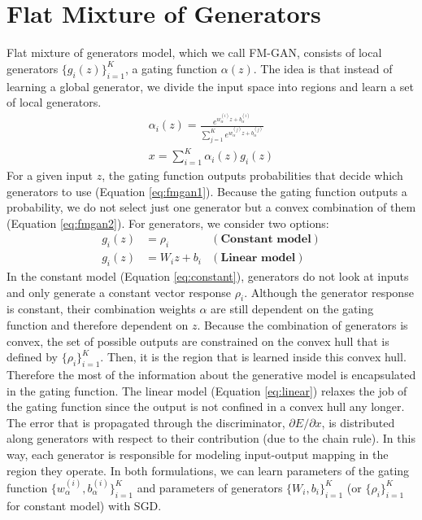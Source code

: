 \documentclass[a4paper,onesided,12pt]{report}
\begin{document}
\section{Flat Mixture of Generators}
\label{sec:fmgan}
Flat mixture of generators model, which we call FM-GAN, consists of local generators $\{g_i(z)\}_{i=1}^{K}$, a gating function $\alpha(z)$. The idea is that instead of learning a global generator, we divide the input space into regions and learn a set of local generators.
\begin{gather}
\alpha_i(z) = \frac{e^{w_{\alpha}^{(i)}z+b_{\alpha}^{(i)}}}{\sum_{j=1}^K e^{w_{\alpha}^{(j)}z+b_{\alpha}^{(j)}}} \label{eq:fmgan1}\\
x = \sum_{i=1}^K \alpha_i(z) g_i(z) \label{eq:fmgan2}
\end{gather}
For a given input $z$, the gating function outputs probabilities that decide which generators to use (Equation \ref{eq:fmgan1}). Because the gating function outputs a probability, we do not select just one generator but a convex combination of them (Equation \ref{eq:fmgan2}). For generators, we consider two options:
\begin{align}
g_i(z) &= \rho_i  & (\textbf{Constant model}) \label{eq:constant}\\
g_i(z) &= W_i z + b_i  & (\textbf{Linear model}) \label{eq:linear}
\end{align}
In the constant model (Equation \ref{eq:constant}), generators do not look at inputs and only generate a constant vector response $\rho_i$. Although the generator response is constant, their combination weights $\alpha$ are still dependent on the gating function and therefore dependent on $z$. Because the combination of generators is convex, the set of possible outputs are constrained on the convex hull that is defined by $\{\rho_i\}_{i=1}^K$. Then, it is the region that is learned inside this convex hull. Therefore the most of the information about the generative model is encapsulated in the gating function. The linear model (Equation \ref{eq:linear}) relaxes the job of the gating function since the output is not confined in a convex hull any longer. The error that is propagated through the discriminator, $\partial E / \partial x$, is distributed along generators with respect to their contribution (due to the chain rule). In this way, each generator is responsible for modeling input-output mapping in the region they operate. In both formulations, we can learn parameters of the gating function $\{w_{\alpha}^{(i)}, b_{\alpha}^{(i)}\}_{i=1}^K$ and parameters of generators $\{W_i, b_i \}_{i=1}^K$ (or $\{ \rho_i \}_{i=1}^K$ for constant model) with SGD.
\end{document}
